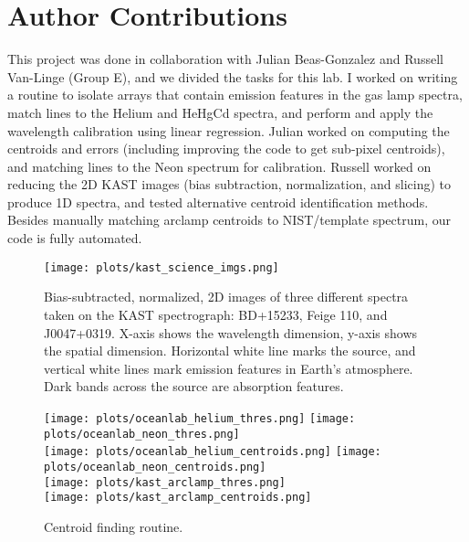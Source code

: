 \documentclass[preprint]{aastex62}
\begin{document}
\section{Author Contributions}
This project was done in collaboration with Julian Beas-Gonzalez and Russell Van-Linge (Group
E), and we divided the tasks for this lab. I worked on writing a routine to isolate arrays that contain emission features in the gas lamp spectra, match lines to the Helium and HeHgCd spectra, and perform and apply the wavelength calibration using linear regression. Julian worked on computing the centroids and errors (including improving the code to get sub-pixel centroids), and matching lines to the Neon spectrum for calibration. Russell worked on reducing the 2D KAST images (bias subtraction, normalization, and slicing) to produce 1D spectra, and tested alternative centroid identification methods. Besides manually matching arclamp centroids to NIST/template spectrum, our code is fully automated.

\begin{figure}[H]
\begin{center}
\texttt{[image: plots/kast\_science\_imgs.png]} 
\caption{Bias-subtracted, normalized, 2D images of three different spectra taken on the KAST spectrograph: BD+15233, Feige 110, and J0047+0319. X-axis shows the wavelength dimension, y-axis shows the spatial dimension. Horizontal white line marks the source, and vertical white lines mark emission features in Earth's atmosphere. Dark bands across the source are absorption features.} \label{fig:science_images}
\end{center}
\end{figure}

\begin{figure}[H]
\begin{center}
\texttt{[image: plots/oceanlab\_helium\_thres.png]}
\texttt{[image: plots/oceanlab\_neon\_thres.png]} \\
\texttt{[image: plots/oceanlab\_helium\_centroids.png]}
\texttt{[image: plots/oceanlab\_neon\_centroids.png]} \\
\texttt{[image: plots/kast\_arclamp\_thres.png]} \\
\texttt{[image: plots/kast\_arclamp\_centroids.png]} 
\caption{Centroid finding routine.} \label{fig:centoid}
\end{center}
\end{figure}
\end{document}
